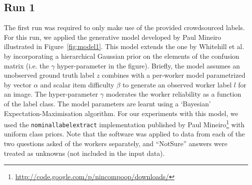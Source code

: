 \documentclass{../acm_proc_article-me11_tweaked}
\begin{document}
\subsection{Run 1}
The first run was required to only make use of the provided crowdsourced labels. For this run, we applied the generative model developed by Paul Mineiro~\cite{Mineiro20110124} illustrated in Figure~\ref{fig:model1}. This model extends the one by Whitehill et al.~\cite{NIPS2009_0100} by incorporating a hierarchical Gaussian prior on the elements of the confusion matrix (i.e. the $\gamma$ hyper-parameter in the figure). Briefly, the model assumes an unobserved ground truth label $z$ combines with a per-worker model parametrized by vector $\alpha$ and scalar item difficulty $\beta$ to generate an observed worker label $l$ for an image. The hyper-parameter $\gamma$ moderates the worker reliability as a function of the label class. The model parameters are learnt using a `Bayesian' Expectation-Maximisation algorithm. For our experiments with this model, we used the \texttt{nominallabelextract} implementation published by Paul Mineiro\footnote{\url{http://code.google.com/p/nincompoop/downloads/}} with uniform class priors. Note that the software was applied to data from each of the two questions asked of the workers separately, and ``NotSure'' answers were treated as unknowns (not included in the input data).
\end{document}
